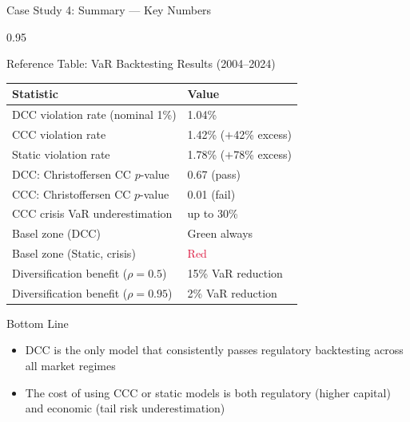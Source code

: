 \documentclass[9pt, aspectratio=169, t]{beamer}
\begin{document}
\begin{frame}{Case Study 4: Summary --- Key Numbers}
    \begin{cminipage}{0.95\textwidth}
    {\footnotesize
    \begin{block}{Reference Table: VaR Backtesting Results (2004--2024)}
        {\small
        \begin{center}
        \begin{tabular}{l|l}
            \hline
            \textbf{Statistic} & \textbf{Value} \\
            \hline
            DCC violation rate (nominal 1\%) & 1.04\% \\
            CCC violation rate              & 1.42\% ($+$42\% excess) \\
            Static violation rate           & 1.78\% ($+$78\% excess) \\
            DCC: Christoffersen CC $p$-value & 0.67 (pass) \\
            CCC: Christoffersen CC $p$-value & 0.01 (fail) \\
            CCC crisis VaR underestimation  & up to 30\% \\
            Basel zone (DCC)                & \textcolor{Forest}{Green} always \\
            Basel zone (Static, crisis)     & \textcolor{Crimson}{Red} \\
            Diversification benefit ($\rho = 0.5$) & 15\% VaR reduction \\
            Diversification benefit ($\rho = 0.95$) & 2\% VaR reduction \\
            \hline
        \end{tabular}
        \end{center}
        }
    \end{block}
    \vspace{-2mm}
    \begin{alertblock}{Bottom Line}
        \begin{itemize}\setlength{\itemsep}{0pt}
            \item DCC is the only model that consistently passes regulatory backtesting across all market regimes
            \item The cost of using CCC or static models is both regulatory (higher capital) and economic (tail risk underestimation)
        \end{itemize}
    \end{alertblock}
    }
    \end{cminipage}
\end{frame}
\end{document}
